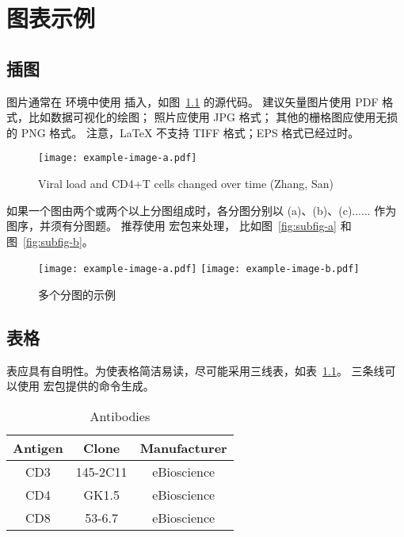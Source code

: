 
\chapter{图表示例}

\section{插图}

图片通常在  环境中使用  插入，如图~\ref{fig:example} 的源代码。
建议矢量图片使用 PDF 格式，比如数据可视化的绘图；
照片应使用 JPG 格式；
其他的栅格图应使用无损的 PNG 格式。
注意，LaTeX 不支持 TIFF 格式；EPS 格式已经过时。

\begin{figure}
  \centering
  \texttt{[image: example-image-a.pdf]}
  \caption{Viral load and CD4+T cells changed over time (Zhang, San)}
  \label{fig:example}
\end{figure}

如果一个图由两个或两个以上分图组成时，各分图分别以 (a)、(b)、(c)...... 作为图序，并须有分图题。
推荐使用  宏包来处理， 比如图~\ref{fig:subfig-a} 和图~\ref{fig:subfig-b}。

\begin{figure}
  \centering
    {\texttt{[image: example-image-a.pdf]}}
    {\texttt{[image: example-image-b.pdf]}}
  \caption{多个分图的示例}
  \label{fig:multi-image}
\end{figure}



\section{表格}

表应具有自明性。为使表格简洁易读，尽可能采用三线表，如表~\ref{tab:three-line}。
三条线可以使用  宏包提供的命令生成。

\begin{table}
  \centering
  \caption{Antibodies}
  \begin{tabular}{ccc}
    \toprule
    Antigen & Clone    & Manufacturer \\
    \midrule
    CD3     & 145-2C11 & eBioscience \\
    CD4     & GK1.5    & eBioscience \\
    CD8     & 53-6.7   & eBioscience \\
    \bottomrule
  \end{tabular}
  \label{tab:three-line}
\end{table}

